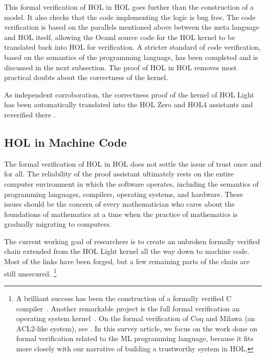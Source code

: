 \documentclass[brochure,english,12pt]{bourbaki}
\theoremstyle{plain}
\begin{document}
This formal verification of HOL in HOL goes  further than the construction of a model.
It also checks that the code implementing the logic is bug free.  The code verification is based on the 
parallels mentioned above between the meta language and HOL itself, allowing the Ocaml source code for the HOL kernel to be
translated back into HOL for verification.  A stricter standard of code verification, based
on the semantics of the programming language, has been completed and is discussed in the next subsection.
The proof of HOL in HOL removes most practical doubts about the correctness of the kernel.

As independent corroboration, the correctness proof of the kernel of HOL Light 
has been automatically translated into the HOL Zero and HOL4 assistants
and reverified there \cite{adams2010introducing}.






\subsection{HOL in Machine Code}

The formal verification of HOL in HOL does not settle the issue of trust once and for all.
The reliability of the proof assistant ultimately
rests on the entire computer environment in which the software operates, 
including the semantics of programming languages,
compilers, operating systems, and hardware.  These issues should be the concern of
every mathematician who cares about the foundations of mathematics at a time when
the practice of mathematics is gradually migrating to  computers.


 The current working goal of researchers is to create an unbroken formally verified chain extended from the
HOL Light kernel all the way down to machine code.  Most of the links have been forged, but a few
remaining parts of the chain
are still unsecured.  
\footnote{A brilliant success has been the construction of a formally verified C compiler~\cite{CC}. Another remarkable
project is the full formal verification an operating system kernel~\cite{sel4}.  
On the formal verification of  Coq and Milawa (an ACL2-like system), see
\cite{barras2010sets} \cite{myreen2012reflective}.
In this survey article,
we focus on the work done on formal verification related to the ML programming language, because it fits more closely
with our narrative of building a trustworthy system in HOL.}
\end{document}
